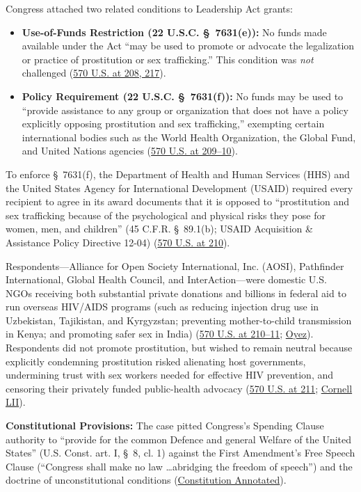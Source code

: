\documentclass[12pt]{article}
\begin{document}
Congress attached two related conditions to Leadership Act grants:
\begin{itemize}
  \item \textbf{Use-of-Funds Restriction (22 U.S.C. \S~7631(e)):} No funds made available under the Act ``may be used to promote or advocate the legalization or practice of prostitution or sex trafficking.'' This condition was \emph{not} challenged (\href{https://supreme.justia.com/cases/federal/us/570/205/}{570 U.S. at 208, 217}).
  \item \textbf{Policy Requirement (22 U.S.C. \S~7631(f)):} No funds may be used to ``provide assistance to any group or organization that does not have a policy explicitly opposing prostitution and sex trafficking,'' exempting certain international bodies such as the World Health Organization, the Global Fund, and United Nations agencies (\href{https://supreme.justia.com/cases/federal/us/570/205/}{570 U.S. at 209--10}).
\end{itemize}
To enforce \S~7631(f), the Department of Health and Human Services (HHS) and the United States Agency for International Development (USAID) required every recipient to agree in its award documents that it is opposed to ``prostitution and sex trafficking because of the psychological and physical risks they pose for women, men, and children'' (45 C.F.R. \S~89.1(b); USAID Acquisition \& Assistance Policy Directive 12-04) (\href{https://supreme.justia.com/cases/federal/us/570/205/}{570 U.S. at 210}).

Respondents---Alliance for Open Society International, Inc. (AOSI), Pathfinder International, Global Health Council, and InterAction---were domestic U.S. NGOs receiving both substantial private donations and billions in federal aid to run overseas HIV/AIDS programs (such as reducing injection drug use in Uzbekistan, Tajikistan, and Kyrgyzstan; preventing mother-to-child transmission in Kenya; and promoting safer sex in India) (\href{https://supreme.justia.com/cases/federal/us/570/205/}{570 U.S. at 210--11}; \href{https://www.oyez.org/cases/2012/12-10}{Oyez}). Respondents did not promote prostitution, but wished to remain neutral because explicitly condemning prostitution risked alienating host governments, undermining trust with sex workers needed for effective HIV prevention, and censoring their privately funded public-health advocacy (\href{https://supreme.justia.com/cases/federal/us/570/205/}{570 U.S. at 211}; \href{https://www.law.cornell.edu/supct/cert/12-10}{Cornell LII}).

\textbf{Constitutional Provisions:} The case pitted Congress's Spending Clause authority to ``provide for the common Defence and general Welfare of the United States'' (U.S. Const. art. I, \S~8, cl. 1) against the First Amendment's Free Speech Clause (``Congress shall make no law \ldots abridging the freedom of speech'') and the doctrine of unconstitutional conditions (\href{https://www.law.cornell.edu/constitution-conan/amendment-1/conditions-exceeding-the-scope-of-the-program}{Constitution Annotated}).
\end{document}

